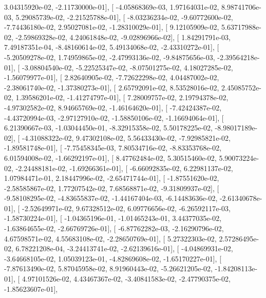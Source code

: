 \documentclass{article}
\begin{document}
          3.04315920e-02,  -2.11730000e-01],
       [ -4.05868369e-03,   1.97164031e-02,   8.98741706e-03,
          5.29085739e-02,  -2.21525788e-01],
       [ -8.03236234e-02,  -9.60772600e-02,  -7.74436180e-02,
          2.95027081e-02,  -1.28310029e-01],
       [  9.12105909e-02,   5.63717988e-02,  -2.59869328e-02,
          4.24061848e-02,  -9.02896966e-02],
       [  1.84291791e-03,   7.49187351e-04,  -8.48160614e-02,
          5.49134068e-02,  -2.43310272e-01],
       [ -5.20509278e-02,   1.74959865e-02,  -2.47993136e-02,
         -9.84875656e-03,  -2.39564218e-01],
       [ -3.08804540e-02,  -5.22525347e-02,  -8.07501275e-02,
          4.18027285e-02,  -1.56079977e-01],
       [  2.82640905e-02,  -7.72622298e-02,   4.04487002e-02,
         -2.38061740e-02,  -1.37380273e-01],
       [  2.65792091e-02,   8.53528016e-02,   2.45085752e-02,
          1.39586201e-02,  -1.41274797e-01],
       [  7.28009757e-02,   2.19794378e-02,  -4.97302582e-02,
          8.94665769e-02,  -1.46164620e-01],
       [ -7.42424387e-02,  -4.43720994e-03,  -2.97127910e-02,
         -1.58850106e-02,  -1.16694064e-01],
       [  6.21390667e-03,  -1.03044450e-01,  -8.32915358e-02,
          5.50178225e-02,  -8.98017189e-02],
       [ -4.31088322e-02,   9.47302108e-02,   5.56433430e-02,
         -7.92985821e-02,  -1.89581748e-01],
       [ -7.75458345e-03,   7.80534716e-02,  -8.83353768e-02,
          6.01594008e-02,  -1.66292197e-01],
       [  8.47762484e-02,   5.30515460e-02,   5.90073224e-02,
         -2.24488181e-02,  -1.69266361e-01],
       [ -6.66092835e-02,   6.22981137e-02,   1.07984471e-01,
          2.18447996e-02,  -2.65471744e-01],
       [ -1.87551620e-02,  -2.58585867e-02,   1.77207542e-02,
          7.68568871e-02,  -9.31809937e-02],
       [ -9.58108295e-02,  -4.83655837e-02,  -1.44167404e-03,
         -6.14483636e-02,  -2.61340678e-01],
       [ -2.52649971e-02,   9.67328512e-02,   6.09776656e-02,
         -6.26592117e-03,  -1.58730224e-01],
       [ -1.04365196e-01,  -1.01465243e-01,   3.44377035e-02,
         -1.63864655e-02,  -2.66769726e-01],
       [ -6.87762282e-03,  -2.16290796e-02,   4.67598571e-02,
          4.55683108e-02,  -2.28650769e-01],
       [  5.27322303e-02,   2.57286495e-02,   6.78221208e-04,
         -3.24413741e-02,  -2.62139616e-01],
       [ -4.04869931e-02,  -3.64668105e-02,   1.05039123e-01,
         -4.82869608e-02,  -1.65170227e-01],
       [ -7.87613490e-02,   5.87045958e-02,   8.91960443e-02,
         -5.26621205e-02,  -1.84208113e-01],
       [  4.97101526e-02,   4.43467367e-02,  -3.40841583e-02,
         -2.47790375e-02,  -1.85623607e-01],
\end{document}
